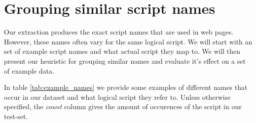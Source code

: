 \section{Grouping similar script names}
Our extraction produces the exact script names that are used in web pages. However, these names often vary for the same logical script. We will start with an set of example script names and what actual script they map to. We will then present our heuristic for grouping similar names and evaluate it's effect on a set of example data.

In table \ref{tab:example_names} we provide some examples of different names that occur in our dataset and what logical script they refer to. Unless otherwise specified, the \emph{count} column gives the amount of occurences of the script in our test-set.

